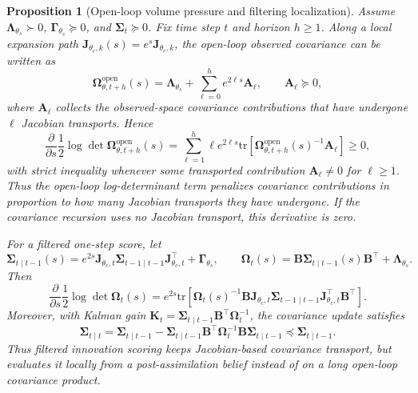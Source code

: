 \documentclass[10pt,a4paper]{amsart}
\newtheorem{proposition}{Proposition}
\newcommand{\tr}{\mathrm{tr}}
\begin{document}
\begin{proposition}[Open-loop volume pressure and filtering localization]
\label{prop:volume_pressure_localization}
Assume $\bm\Lambda_{\theta_s}\succ0$, $\bm\Gamma_{\theta_s}\succeq0$, and $\bm\Sigma_t\succeq0$. Fix time step $t$ and horizon $h\ge1$. Along a local
expansion path $\bm J_{\theta_c,k}(s)=e^s\bm J_{\theta_c,k}$, the open-loop
observed covariance can be written as
\[
\bm\Omega^{\mathrm{open}}_{\theta,t+h}(s)
=
\bm\Lambda_{\theta_s}
+
\sum_{\ell=0}^{h} e^{2\ell s}\bm A_\ell,
\qquad
\bm A_\ell\succeq0,
\]
where $\bm A_\ell$ collects the observed-space covariance contributions that
have undergone $\ell$ Jacobian transports. Hence
\[
\frac{\partial}{\partial s}
\frac12\log\det\bm\Omega^{\mathrm{open}}_{\theta,t+h}(s)
=
\sum_{\ell=1}^{h}
\ell e^{2\ell s}
\tr \left[
\bm\Omega^{\mathrm{open}}_{\theta,t+h}(s)^{-1}
\bm A_\ell
\right]
\ge 0,
\]
with strict inequality whenever some transported contribution
$\bm A_\ell\neq0$ for $\ell\ge1$. Thus the open-loop log-determinant term
penalizes covariance contributions in proportion to how many Jacobian transports
they have undergone. If the covariance recursion uses no Jacobian transport,
this derivative is zero.

For a filtered one-step score, let
\[
\bm\Sigma_{t\mid t-1}(s)
=
e^{2s}
\bm J_{\theta_c,t}\bm\Sigma_{t-1\mid t-1}\bm J_{\theta_c,t}^{\top}
+
\bm\Gamma_{\theta_s},
\qquad
\bm\Omega_t(s)=
\bm B\bm\Sigma_{t\mid t-1}(s)\bm B^\top+\bm\Lambda_{\theta_s}.
\]
Then
\[
\frac{\partial}{\partial s}
\frac12\log\det\bm\Omega_t(s)
=
e^{2s}
\tr \left[
\bm\Omega_t(s)^{-1}
\bm B\bm J_{\theta_c,t}\bm\Sigma_{t-1\mid t-1}
\bm J_{\theta_c,t}^{\top}\bm B^\top
\right].
\]
Moreover, with Kalman gain
$\bm K_t=\bm\Sigma_{t\mid t-1}\bm B^\top\bm\Omega_t^{-1}$, the covariance update satisfies
\[
\bm\Sigma_{t\mid t}
=
\bm\Sigma_{t\mid t-1}
-
\bm\Sigma_{t\mid t-1}\bm B^\top
\bm\Omega_t^{-1}
 \bm B\bm\Sigma_{t\mid t-1}
\preceq
\bm\Sigma_{t\mid t-1}.
\]
Thus filtered innovation scoring keeps Jacobian-based covariance transport, but
evaluates it locally from a post-assimilation belief instead of on a long
open-loop covariance product.
\end{proposition}
\end{document}
